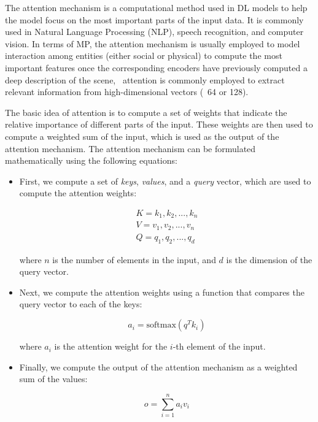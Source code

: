 The attention mechanism \cite{vaswani2017attention} is a computational method used in \ac{DL} models to help the model focus on the most important parts of the input data. It is commonly used in Natural Language Processing (NLP), speech recognition, and computer vision. In terms of \ac{MP}, the attention mechanism is usually employed to model interaction among entities (either social or physical) to compute the most important features once the corresponding encoders have previously computed a deep description of the scene, \ie \, attention is commonly employed to extract relevant information from high-dimensional vectors (\eg \ 64 or 128).

The basic idea of attention is to compute a set of weights that indicate the relative importance of different parts of the input. These weights are then used to compute a weighted sum of the input, which is used as the output of the attention mechanism. The attention mechanism can be formulated mathematically using the following equations:

\begin{itemize}
	\item First, we compute a set of \textit{keys}, \textit{values}, and a \textit{query} vector, which are used to compute the attention weights:
	
	\begin{equation}
		\begin{split}
			K = {k_1, k_2, ..., k_n} \\
			V = {v_1, v_2, ..., v_n} \\
			Q = {q_1, q_2, ..., q_d}
		\end{split}
	\end{equation}

	where $n$ is the number of elements in the input, and $d$ is the dimension of the query vector.
	
	\item Next, we compute the attention weights using a function that compares the query vector to each of the keys:
	
	\begin{equation}
		a_i = \text{softmax}(q^T k_i)
	\end{equation}
	
	where $a_i$ is the attention weight for the $i$-th element of the input. 
	
	\item Finally, we compute the output of the attention mechanism as a weighted sum of the values:
	
	\begin{equation}
		o = \sum_{i=1}^{n} a_i v_i
	\end{equation}
\end{itemize}

